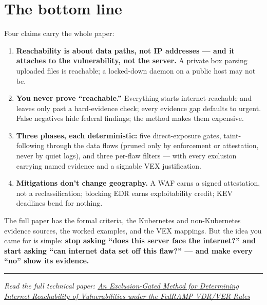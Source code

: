 \documentclass[11pt]{article}
\begin{document}
\section*{The bottom line}
Four claims carry the whole paper:
\begin{enumerate}[leftmargin=1.8em]
\item \textbf{Reachability is about data paths, not IP addresses --- and it
  attaches to the vulnerability, not the server.} A private box parsing uploaded
  files is reachable; a locked-down daemon on a public host may not be.
\item \textbf{You never prove ``reachable.''} Everything starts
  internet-reachable and leaves only past a hard-evidence check; every evidence
  gap defaults to urgent. False negatives hide federal findings; the method makes
  them expensive.
\item \textbf{Three phases, each deterministic:} five direct-exposure gates,
  taint-following through the data flows (pruned only by enforcement or
  attestation, never by quiet logs), and three per-flaw filters --- with every
  exclusion carrying named evidence and a signable VEX justification.
\item \textbf{Mitigations don't change geography.} A WAF earns a signed
  attestation, not a reclassification; blocking EDR earns exploitability credit;
  KEV deadlines bend for nothing.
\end{enumerate}

The full paper has the formal criteria, the Kubernetes and non-Kubernetes evidence
sources, the worked examples, and the VEX mappings. But the idea you came for is
simple: \textbf{stop asking ``does this server face the internet?'' and start
asking ``can internet data set off this flaw?'' --- and make every ``no'' show its
evidence.}

\bigskip
\noindent\textcolor{rule}{\rule{\textwidth}{0.4pt}}
\medskip

\noindent\emph{Read the full technical paper:
\href{https://stackarmor.github.io/rfc-fedramp-vdr/internet-accessibility.pdf}{An
Exclusion-Gated Method for Determining Internet Reachability of Vulnerabilities
under the FedRAMP VDR/VER Rules}}
\end{document}
